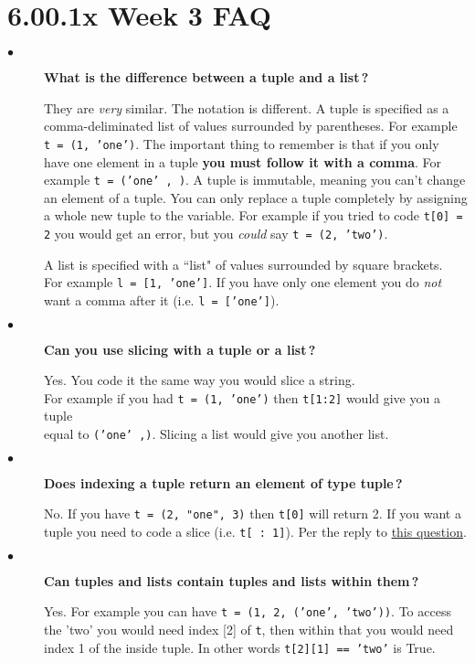 \documentclass{article}
\newcommand{\inlinecode}[1]{\texttt{#1}}
\newcommand{\link}[2]{\textcolor{blue}{\href{#2}{#1}}}
\newcommand{\question}[1]{\item[$\bullet$] 
	\begin{minipage}[t]{\textwidth}
		\bfseries#1
	\end{minipage}
	\hfil
}
\newenvironment{answer}{}{}
\newenvironment{faq}{\begin{description}}{\end{description}}
\begin{document}
	
	\section*{\Huge6.00.1x Week 3 FAQ}
	
	\begin{faq}
		\question{What is the difference between a tuple and a list\,?}
		\begin{answer}
			They are \textit{very} similar. The notation is different. A tuple is specified as a comma-deliminated list of values surrounded by parentheses.  For example \inlinecode{t = (1, 'one')}.  The important thing to remember is that if you only have one element in a tuple \textbf{you must follow it with a comma}. For example \inlinecode{t = ('one' , )}. A tuple is immutable, meaning you can't change an element of a tuple.  You can only replace a tuple completely by assigning a whole new tuple to the variable.  For example if you tried to code \inlinecode{t[0] = 2} you would get an error, but you \textit{could} say \inlinecode{t = (2, 'two')}.
			
			A list is specified with a ``list" of values surrounded by square brackets.\\For example \inlinecode{l = [1, 'one']}.  If you have only one element you do \textit{not} want a comma after it (i.e. \inlinecode{l = ['one']}).
		\end{answer}
		
		\question{Can you use slicing with a tuple or a list\,?}
		\begin{answer}
			Yes.  You code it the same way you would slice a string.\\For example if you had \inlinecode{t = (1, 'one')} then \inlinecode{t[1:2]} would give you a tuple\\equal to \inlinecode{('one' ,)}. Slicing a list would give you another list.
		\end{answer}
		
		\question{Does indexing a tuple return an element of type tuple\,?}
		\begin{answer}
			No. If you have \inlinecode{t = (2,  "one", 3)} then \inlinecode{t[0]} will return 2.  If you want a tuple you need to code a slice (i.e. \inlinecode{t[ : 1]}). Per the reply to \link{this question}{https://courses.edx.org/courses/course-v1:MITx+6.00.1x+2T2017\_2/discussion/forum/35e127f944e149742273bc1b58766b721cd95c85/threads/5a6d725b24451a09d9000216}.
		\end{answer}
		
		\question{Can tuples and lists contain tuples and lists within them\,?}
		\begin{answer}
			Yes. For example you can have \inlinecode{t = (1, 2, ('one', 'two'))}. To access the 'two' you would need index [2] of \inlinecode{t}, then within that you would need index 1 of the inside tuple. In other words \inlinecode{t[2][1] == 'two'} is True.
		\end{answer}
		

\end{faq}
\end{document}
